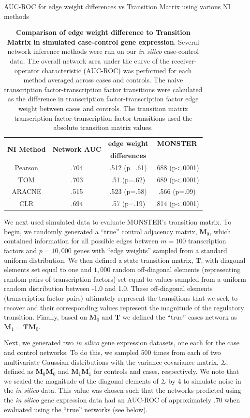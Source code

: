 {\tiny
\begin{table}
AUC-ROC for edge weight differences vs Transition Matrix using various
NI methods\\
\begin{tabular}{|cc||c|c|}
\hline
\multirow{2}{*}{\textbf{NI Method}} & \multirow{2}{*}{\textbf{Network AUC}} & \textbf{edge weight } & \textbf{MONSTER}\tabularnewline
 &  & \textbf{differences} & \tabularnewline
\hline 
Pearson & .704 & .512 (p=.61) & .688 (p<.0001)\tabularnewline
\hline 
TOM & .703 & .51 (p=.62) & .689 (p<.0001)\tabularnewline
\hline 
ARACNE & .515 & .523 (p=.58) & .566 (p=.09)\tabularnewline
\hline 
CLR & .694 & .57 (p=.19) & .814 (p<.0001)\tabularnewline
\hline 
\end{tabular}\caption{\textbf{Comparison of edge weight difference to Transition Matrix in simulated case-control gene expression}. Several network inference methods were run on our \emph{in silico} case-control data. The overall network area under the curve of the receiver-operator characteristic (AUC-ROC) was performed for each method averaged across cases and controls. The naive transcription factor-transcription factor transitions were calculated as the difference in transcription factor-transcription factor edge weight between cases and controls. The transition matrix transcription factor-transcription factor transitions used the absolute transition matrix values. }
\label{tab:tableInSilico}
\end{table}
}

We next used simulated data to evaluate MONSTER's transition matrix. To begin, we randomly generated a ``true'' control adjacency matrix, $\mathbf{M}_{0}$, which contained information for all possible edges between $m=100$ transcription factors and $p=10,000$ genes with ``edge weights'' sampled from a standard uniform distribution. We then defined a state transition matrix, \textbf{T}, with diagonal elements set equal to one and $1,000$ random off-diagonal elements (representing random pairs of transcription factors) set equal to values sampled from a uniform random distribution between -1.0 and 1.0. These off-diagonal elements (transcription factor pairs) ultimately represent the transitions that we seek to recover and their corresponding values represent the magnitude of the regulatory transition. Finally, based on $\mathbf{M}_{0}$ and \textbf{T} we defined the ``true'' cases network as $\mathbf{M}_{1}=\textbf{T} \mathbf{M}_{0}$. 

Next, we generated two \emph{in silico} gene expression datasets, one each for the case and control networks. To do this, we sampled 500 times from each of two multivariate Gaussian distributions with the variance-covariance matrix, $\Sigma$, defined as $\mathbf{M}_{0}\mathbf{M}_{0}^{\prime}$ and $\mathbf{M}_{1}\mathbf{M}_{1}^{\prime}$ for controls and cases, respectively. We note that we scaled the magnitude of the diagonal elements of $\Sigma$ by 4 to simulate noise in the \emph{in silico} data. This value was chosen such that the networks predicted using the \emph{in silico} gene expression data had an AUC-ROC of approximately .70 when evaluated using the ``true'' networks (see below).


